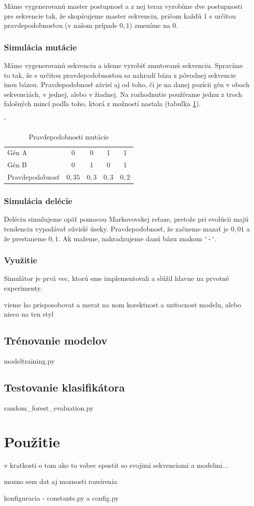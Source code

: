 
Máme vygenerovanú master postupnosť a z nej teraz vyrobíme dve postupnosti pre sekvencie tak, že skopírujeme master sekvenciu, pričom každú 1 s určitou pravdepodobnosťou (v našom prípade $0,1$) zmeníme na 0.

\subsubsection{Simulácia mutácie}

Máme vygenerovanú sekvenciu a ideme vyrobiť zmutovanú sekvenciu. Spravíme to tak, že s určitou pravdepodobnosťou sa nahradí báza z pôvodnej sekvencie inou bázou. Pravdepodobnosť závisí aj od toho, či je na danej pozícii gén v oboch sekvenciách, v jednej, alebo v žiadnej. Na rozhodnutie používame jednu z troch falošných mincí podľa toho, ktorá z možností nastala (tabuľka \ref{tab:mutation-prob}).

\begin{table}[h]
\catcode` %
\centering
\begin{tabular}{lcccc}
Gén A & 0 & 0 & 1 & 1\\
Gén B & 0 & 1 & 0 & 1\\
Pravdepodobnosť & $0,35$ & $0,3$ & $0,3$ & $0,2$\\
\end{tabular}
\caption{Pravdepodobnosti mutácie}
\label{tab:mutation-prob}
\end{table}

\subsubsection{Simulácia delécie}
Deléciu simulujeme opäť pomocou Markovovskej reťaze, pretože pri evolúcii majú tendenciu vypadávať súvislé úseky. Pravdepodobnosť, že začneme mazať je $0,01$ a že prestaneme $0,1$.
Ak mažeme, nahradzujeme danú bázu znakom {\verb+'-'+}.

\subsubsection{Využitie}

Simulátor je prvá vec, ktorú sme implementovali a slúžil hlavne na prvotné experimenty.

\todo vieme ho prisposobovat a merat na nom korektnost a uzitocnost modelu, alebo nieco na ten styl

\subsection{Trénovanie modelov}
\todo modeltraining.py

\subsection{Testovanie klasifikátora}
\todo random\_forest\_evaluation.py

\section{Použitie}
\todo v kratkosti o tom ako to vobec spustit so svojimi sekvenciami a modelmi...

\todo mozno sem dat aj moznosti rozsirenia

\todo konfiguracia - constants.py a config.py

